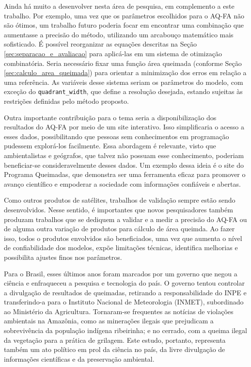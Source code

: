 \documentclass[cic,tc]{iiufrgs}
\begin{document}
Ainda há muito a desenvolver nesta área de pesquisa, em complemento a este trabalho. Por exemplo, uma vez que os parâmetros escolhidos para o AQ-FA não são ótimos, um trabalho futuro poderia focar em encontrar uma combinação que aumentasse a precisão do método, utilizando um arcabouço matemático mais sofisticado. É possível reorganizar as equações descritas na Seção \ref{sec:separacao_e_avaliacao} para aplicá-las em um sistema de otimização combinatória. Seria necessário fixar uma função área queimada (conforme Seção \ref{sec:calculo_area_queimada}) para orientar a minimização dos erros em relação a uma referência. As variáveis desse sistema seriam os parâmetros do modelo, com exceção do \texttt{quadrant\_width}, que define a resolução desejada, estando sujeitas às restrições definidas pelo método proposto.

Outra importante contribuição para o tema seria a disponibilização dos resultados do AQ-FA por meio de um site interativo. Isso simplificaria o acesso a esses dados, possibilitando que pessoas sem conhecimentos em programação pudessem explorá-los facilmente. Essa abordagem é relevante, visto que ambientalistas e geógrafos, que talvez não possuam esse conhecimento, poderiam beneficiar-se consideravelmente desses dados. Um exemplo dessa ideia é o site do Programa Queimadas, que demonstra ser uma ferramenta eficaz para promover o avanço científico e empoderar a sociedade com informações confiáveis e abertas. 

Como outros produtos de satélites, trabalhos de validação sempre estão sendo desenvolvidos. Nesse sentido, é importantes que novos pesquisadores também produzam trabalhos que se dediquem a validar e a medir a precisão do AQ-FA ou de alguma outra variação de produtos para cálculo de área queimda. Ao fazer isso, todos o produtos envolvidos são beneficiados, uma vez que aumenta o nível de confiabilidade dos modelos, expõe limitações técnicas, identifica melhorias e possibilita ajustes finos nos parâmetros.


Para o Brasil, esses últimos anos foram marcados por um governo que negou a ciência e enfraqueceu a pesquisa e tecnologia do país. O governo tentou controlar a divulgação de resultados de queimadas, retirando a responsabilidade do INPE e transferindo-a para o Instituto Nacional de Meteorologia (INMET), subordinado ao Ministério da Agricultura. Tornaram-se frequentes as notícias de violações ambientais na Amazônia, como as minerações ilegais que prejudicam a sobrevivência da população indígena ribeirinha; e no cerrado, com a queima ilegal da vegetação para a prática de grilagem. Este estudo, portanto, representa também um ato político em prol da ciência no país, da livre divulgação de informações científicas e da preservação ambiental.






\end{document}
